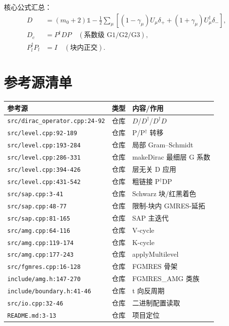 \documentclass[UTF8]{ctexart}
\begin{document}
核心公式汇总：
\begin{align}
D &= (m_0+2)\mathbb{1} - \tfrac12\sum_\mu[(1-\gamma_\mu)U_\mu\delta_{+}+(1+\gamma_\mu)U_\mu^\dagger\delta_{-}], \label{eq:f1}\\
D_c &= P^\dagger D P \quad(\text{系数级 G1/G2/G3}), \label{eq:f2}\\
P_l^\dagger P_l &= I \quad(\text{块内正交}). \label{eq:f3}
\end{align}

\section{参考源清单}
{\small
\begin{xltabular}{\textwidth}{XXX}
\toprule
\textcolor{evidence}{参考源} & 类型 & 内容/作用 \\
\midrule
\endhead
\texttt{\nolinkurl{src/dirac_operator.cpp:24-92}} & 仓库 & $D$/$D^\dagger$/$D^\dagger D$ \\
\texttt{\nolinkurl{src/level.cpp:92-189}} & 仓库 & P/P$^\dagger$ 转移 \\
\texttt{\nolinkurl{src/level.cpp:193-284}} & 仓库 & 局部 Gram--Schmidt \\
\texttt{\nolinkurl{src/level.cpp:286-331}} & 仓库 & makeDirac 最细层 G 系数 \\
\texttt{\nolinkurl{src/level.cpp:394-426}} & 仓库 & 层无关 D 应用 \\
\texttt{\nolinkurl{src/level.cpp:431-542}} & 仓库 & 粗链接 P$^\dagger$DP \\
\texttt{\nolinkurl{src/sap.cpp:3-41}} & 仓库 & Schwarz 块/红黑着色 \\
\texttt{\nolinkurl{src/sap.cpp:48-77}} & 仓库 & 限制-块内 GMRES-延拓 \\
\texttt{\nolinkurl{src/sap.cpp:81-165}} & 仓库 & SAP 主迭代 \\
\texttt{\nolinkurl{src/amg.cpp:64-116}} & 仓库 & V-cycle \\
\texttt{\nolinkurl{src/amg.cpp:119-174}} & 仓库 & K-cycle \\
\texttt{\nolinkurl{src/amg.cpp:177-243}} & 仓库 & applyMultilevel \\
\texttt{\nolinkurl{src/fgmres.cpp:16-128}} & 仓库 & FGMRES 骨架 \\
\texttt{\nolinkurl{include/amg.h:147-270}} & 仓库 & FGMRES\_AMG 类族 \\
\texttt{\nolinkurl{include/boundary.h:41-46}} & 仓库 & t 向反周期 \\
\texttt{\nolinkurl{src/io.cpp:32-46}} & 仓库 & 二进制配置读取 \\
\texttt{\nolinkurl{README.md:3-13}} & 仓库 & 项目定位 \\
\bottomrule
\end{xltabular}
}
\end{document}
